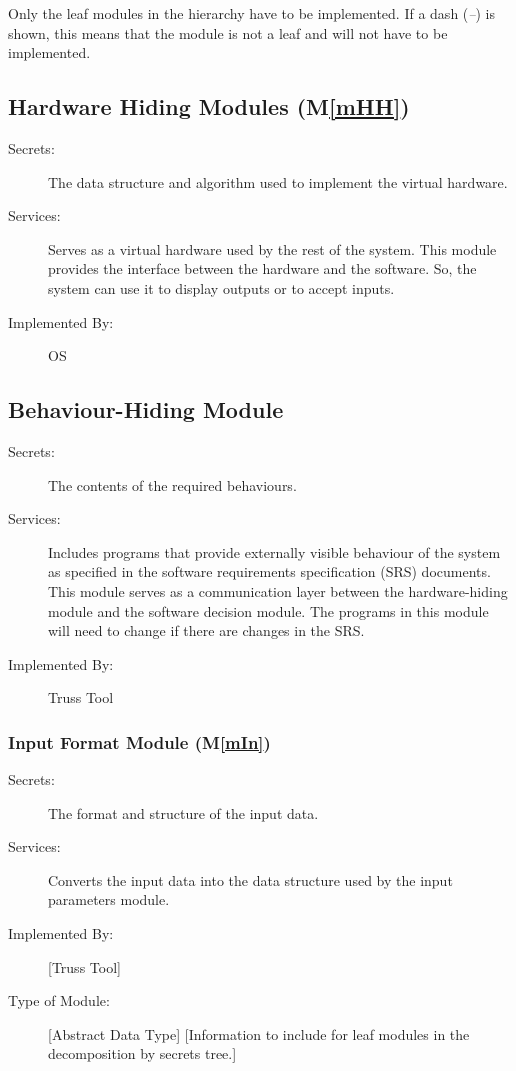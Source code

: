 \documentclass[12pt, titlepage]{article}
\newcommand{\mref}[1]{M\ref{#1}}
\begin{document}
Only the leaf modules in the hierarchy have to be implemented. If a dash
(\emph{--}) is shown, this means that the module is not a leaf and will not have
to be implemented.

\subsection{Hardware Hiding Modules (\mref{mHH})}

\begin{description}
\item[Secrets:]The data structure and algorithm used to implement the virtual
  hardware.
\item[Services:]Serves as a virtual hardware used by the rest of the
  system. This module provides the interface between the hardware and the
  software. So, the system can use it to display outputs or to accept inputs.
\item[Implemented By:] OS
\end{description}

\subsection{Behaviour-Hiding Module}

\begin{description}
\item[Secrets:]The contents of the required behaviours.
\item[Services:]Includes programs that provide externally visible behaviour of
  the system as specified in the software requirements specification (SRS)
  documents. This module serves as a communication layer between the
  hardware-hiding module and the software decision module. The programs in this
  module will need to change if there are changes in the SRS.
\item[Implemented By:] Truss Tool
\end{description}

\subsubsection{Input Format Module (\mref{mIn})}

\begin{description}
\item[Secrets:]The format and structure of the input data.
\item[Services:]Converts the input data into the data structure used by the
  input parameters module.
\item[Implemented By:] [Truss Tool]
\item[Type of Module:] [Abstract Data Type]
  [Information to include for leaf modules in the decomposition by secrets tree.]
\end{description}
\end{document}
